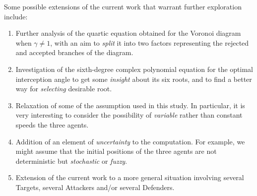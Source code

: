 Some possible extensions of the current work that warrant further exploration include:
\begin{enumerate}
\item Further analysis of the quartic equation obtained for the Voronoi diagram when $\gamma\neq1$, with an aim to \textit{split} it into two factors representing the rejected and accepted branches of the diagram.
\item Investigation of the sixth-degree complex polynomial equation for the optimal interception angle to get some \textit{insight} about its six roots, and to find a better way for \textit{selecting} desirable root.
\item Relaxation of some of the assumption used in this study. In particular, it is very interesting to consider the possibility of \textit{variable} rather than constant speeds the three agents.
\item Addition of an element of \textit{uncertainty} to the computation. For example, we might assume that the initial positions of the three agents are not deterministic but \textit{stochastic} or \textit{fuzzy}.
\item Extension of the current work to a more general situation involving several Targets, several Attackers and/or several Defenders.     
\end{enumerate} 